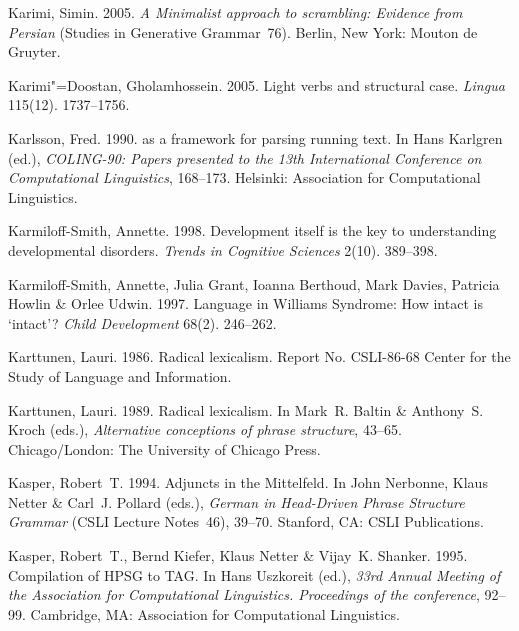 \begin{thebibliography}{1420}
Karimi, Simin. 2005.
\newblock \emph{A {Minimalist} approach to scrambling: {Evidence} from
  {Persian}} (Studies in Generative Grammar~76).
\newblock Berlin, New York: Mouton de Gruyter.

Karimi"=Doostan, Gholamhossein. 2005.
\newblock Light verbs and structural case.
\newblock \emph{Lingua} 115(12). 1737--1756.

Karlsson, Fred. 1990.
 as a framework for parsing running text.
\newblock In Hans Karlgren (ed.), \emph{{COLING-90}: {Papers} presented to the
  {13th International Conference on Computational Linguistics}}, 168--173.
  Helsinki: Association for Computational Linguistics.

Karmiloff-Smith, Annette. 1998.
\newblock Development itself is the key to understanding developmental
  disorders.
\newblock \emph{Trends in Cognitive Sciences} 2(10). 389--398.

Karmiloff-Smith, Annette, Julia Grant, Ioanna Berthoud, Mark Davies, Patricia
  Howlin \& Orlee Udwin. 1997.
\newblock Language in {Williams Syndrome}: {How} intact is `intact'?
\newblock \emph{Child Development} 68(2). 246--262.

Karttunen, Lauri. 1986.
\newblock Radical lexicalism.
\newblock Report {No. CSLI-86-68} Center for the Study of Language and
  Information.

Karttunen, Lauri. 1989.
\newblock Radical lexicalism.
\newblock In Mark~R. Baltin \& Anthony~S. Kroch (eds.), \emph{Alternative
  conceptions of phrase structure}, 43--65. Chicago/London: The University of
  Chicago Press.

Kasper, Robert~T. 1994.
\newblock Adjuncts in the {Mittelfeld}.
\newblock In John Nerbonne, Klaus Netter \& Carl~J. Pollard (eds.),
  \emph{German in {Head-Driven Phrase Structure Grammar}} (CSLI Lecture
  Notes~46), 39--70. Stanford, CA: CSLI Publications.

Kasper, Robert~T., Bernd Kiefer, Klaus Netter \& Vijay~K. Shanker. 1995.
\newblock Compilation of {HPSG} to {TAG}.
\newblock In Hans Uszkoreit (ed.), \emph{33rd {Annual Meeting of the
  Association for Computational Linguistics. Proceedings} of the conference},
  92--99. Cambridge, MA: Association for Computational Linguistics.


\end{thebibliography}

